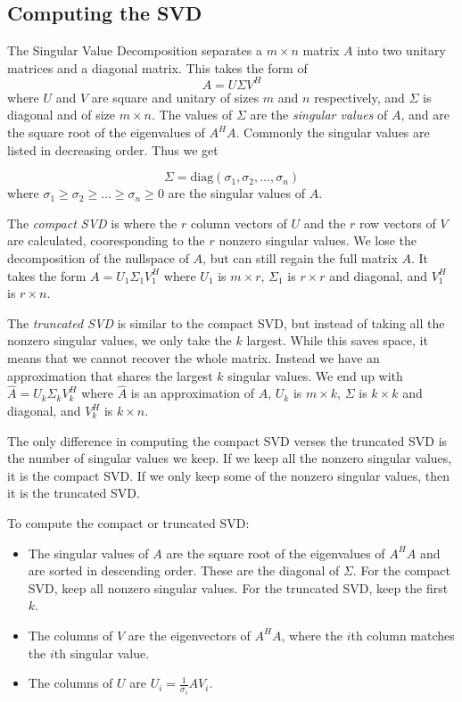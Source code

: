 \subsection*{Computing the SVD}


The Singular Value Decomposition separates a $m \times n$ matrix $A$ into two unitary matrices and a diagonal matrix.
This takes the form of 
\begin{equation*}
A = U \Sigma V^H
\end{equation*}
where $U$ and $V$ are square and unitary of sizes $m$ and $n$ respectively, and $\Sigma$ is diagonal and of size $m \times n$.
The values of $\Sigma$ are the \emph{singular values} of $A$, and are the square root of the eigenvalues of $A^HA$.
Commonly the singular values are listed in decreasing order. Thus we get

\begin{equation*}
\Sigma = \mbox{diag}(\sigma_1,\sigma_2,\ldots,\sigma_n)
\end{equation*}
where $\sigma_1 \geq \sigma_2 \geq \ldots \geq \sigma_n \geq 0$ are the singular values of $A$.

The \emph{compact SVD} is where the $r$ column vectors of $U$ and the $r$ row vectors of $V$ are calculated, cooresponding to the $r$ nonzero singular values.
We lose the decomposition of the nullspace of $A$, but can still regain the full matrix $A$.
It takes the form $A= U_1 \Sigma_1 V_1^H$ where $U_1$ is $m\times r$, $\Sigma_1$ is $r\times r$ and diagonal, and $V_1^H$ is $r\times n$.

The \emph{truncated SVD} is similar to the compact SVD, but instead of taking all the nonzero singular values, we only take the $k$ largest.
While this saves space, it means that we cannot recover the whole matrix.
Instead we have an approximation that shares the largest $k$ singular values.
We end up with $\widehat A = U_k\Sigma_k V_k^H$ where $\widehat A$ is an approximation of $A$, $U_k$ is $m\times k$, $\Sigma$ is $k \times k$ and diagonal, and $V_k^H$ is $k \times n$.

The only difference in computing the compact SVD verses the truncated SVD is the number of singular values we keep.
If we keep all the nonzero singular values, it is the compact SVD.
If we only keep some of the nonzero singular values, then it is the truncated SVD.

To compute the compact or truncated SVD:

\begin{itemize}
\item The singular values of $A$ are the square root of the eigenvalues of $A^HA$ and are sorted in descending order. These are the diagonal of $\Sigma$. For the compact SVD, keep all nonzero singular values. For the truncated SVD, keep the first $k$.
\item The columns of $V$ are the eigenvectors of $A^HA$, where the $i$th column matches the $i$th singular value.
\item The columns of $U$ are $U_i = \frac{1}{\sigma_i} AV_i$.
\end{itemize}

